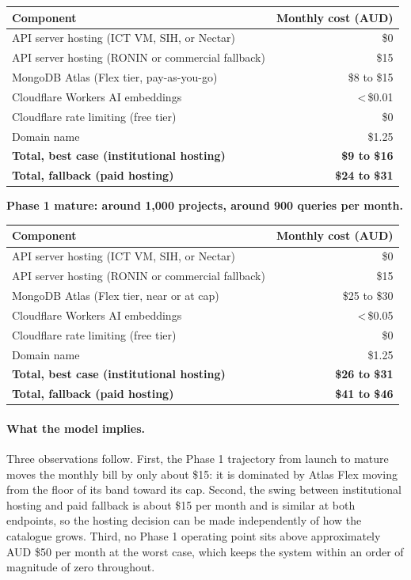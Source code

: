 \documentclass[11pt,a4paper]{article}
\begin{document}
\noindent\begin{tabularx}{\textwidth}{X r}
\toprule
\textbf{Component} & \textbf{Monthly cost (AUD)} \\
\midrule
API server hosting (ICT VM, SIH, or Nectar) & \$0 \\
API server hosting (RONIN or commercial fallback) & \$15 \\
MongoDB Atlas (Flex tier, pay-as-you-go) & \$8 to \$15 \\
Cloudflare Workers AI embeddings & \textless\,\$0.01 \\
Cloudflare rate limiting (free tier) & \$0 \\
Domain name & \$1.25 \\
\midrule
\textbf{Total, best case (institutional hosting)} & \textbf{\$9 to \$16} \\
\textbf{Total, fallback (paid hosting)} & \textbf{\$24 to \$31} \\
\bottomrule
\end{tabularx}

\medskip

\noindent\textbf{Phase 1 mature: around 1{,}000 projects, around 900 queries per month.}

\medskip

\noindent\begin{tabularx}{\textwidth}{X r}
\toprule
\textbf{Component} & \textbf{Monthly cost (AUD)} \\
\midrule
API server hosting (ICT VM, SIH, or Nectar) & \$0 \\
API server hosting (RONIN or commercial fallback) & \$15 \\
MongoDB Atlas (Flex tier, near or at cap) & \$25 to \$30 \\
Cloudflare Workers AI embeddings & \textless\,\$0.05 \\
Cloudflare rate limiting (free tier) & \$0 \\
Domain name & \$1.25 \\
\midrule
\textbf{Total, best case (institutional hosting)} & \textbf{\$26 to \$31} \\
\textbf{Total, fallback (paid hosting)} & \textbf{\$41 to \$46} \\
\bottomrule
\end{tabularx}

\medskip

\paragraph{What the model implies.} Three observations follow. First, the Phase 1 trajectory from launch to mature moves the monthly bill by only about \$15: it is dominated by Atlas Flex moving from the floor of its band toward its cap. Second, the swing between institutional hosting and paid fallback is about \$15 per month and is similar at both endpoints, so the hosting decision can be made independently of how the catalogue grows. Third, no Phase 1 operating point sits above approximately AUD \$50 per month at the worst case, which keeps the system within an order of magnitude of zero throughout.
\end{document}
